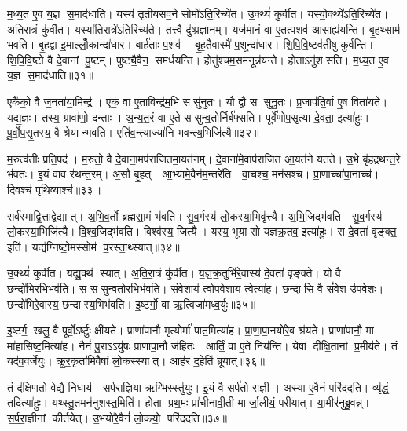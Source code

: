 म॒ध्य॒त ए॒व य॒ज्ञ स॒माद॑धाति। यस्य॑ तृतीयसव॒ने सोमो॑ऽति॒रिच्ये॑त। उ॒क्थ्यं॑ कुर्वीत। यस्यो॒क्थ्ये॑ऽति॒रिच्ये॑त। अ॒ति॒रा॒त्रं कु॑र्वीत। यस्या॑तिरा॒त्रे॑ऽति॒रिच्य॑ते। तत्त्वै दु॑ष्प्रज्ञा॒नम्। यज॑मानं॒ वा ए॒तत्प॒शव॑ आ॒साह्य॑यन्ति। बृ॒हथ्साम॑ भवति। बृ॒हद्वा इ॒माल्लोँ॒कान्दा॑धार। बार्\mbox{}ह॑ताः प॒शव॑। बृ॒ह॒तैवास्मै॑ प॒शून्दा॑धार। शि॒पि॒वि॒ष्टव॑तीषु कुर्वन्ति। शि॒पि॒वि॒ष्टो वै दे॒वानां पु॒ष्टम्। पुष्ट्यै॒वैन॒ सम॑र्धयन्ति। होतु॑श्चम॒समनून्न॑यन्ते। होताऽनु॑शसति। म॒ध्य॒त ए॒व य॒ज्ञ स॒माद॑धाति॥३१॥\anuvakamend[य॒न्ति॒ सव॑नस्याति॒रिच्य॑ते शसति दाधारा॒ष्टौ च॑]

एकै॑को॒ वै ज॒नता॑या॒मिन्द्र॑। एकं॒ वा ए॒ताविन्द्र॑म॒भि ससु॑नुतः। यौ द्वौ स सुनु॒तः। प्र॒जाप॑ति॒र्वा ए॒ष विता॑यते। यद्य॒ज्ञः। तस्य॒ ग्रावा॑णो॒ दन्ताः। अ॒न्य॒त॒रं वा ए॒ते ससुन्व॒तोर्निर्ब॑फ्सति। पूर्वे॑णोप॒सृत्या॑ दे॒वता॒ इत्या॑हुः। पू॒र्वो॒प॒सृ॒तस्य॒ वै श्रेयान्भवति। एति॑व॒न्त्याज्या॑नि भवन्त्य॒भिजि॑त्यै॥३२॥

म॒रुत्व॑तीः प्रति॒पद॑। म॒रुतो॒ वै दे॒वाना॒मप॑राजितमा॒यत॑नम्। दे॒वाना॑मे॒वाप॑राजित आ॒यत॑ने यतते। उ॒भे बृ॑हद्रथन्त॒रे भ॑वतः। इ॒यं वाव र॑थन्त॒रम्। अ॒सौ बृ॒हत्। आ॒भ्यामे॒वैन॑म॒न्तरे॑ति। वा॒चश्च॒ मन॑सश्च। प्रा॒णाच्चा॑पा॒नाच्च॑। दि॒वश्च॑ पृथि॒व्याश्च॑॥३३॥

सर्व॑स्माद्वि॒त्ताद्वेद्यात्। अ॒भि॒व॒र्तो ब्र॑ह्मसा॒मं भ॑वति। सु॒व॒र्गस्य॑ लो॒कस्या॒भिवृ॑त्त्यै। अ॒भि॒जिद्भ॑वति। सु॒व॒र्गस्य॑ लो॒कस्या॒भिजि॑त्यै। वि॒श्व॒जिद्भ॑वति। विश्व॑स्य॒ जित्यै। यस्य॒ भूयासो यज्ञक्र॒तव॒ इत्या॑हुः। स दे॒वता॑ वृङ्क्त॒ इति॑। यद्य॑ग्निष्टो॒मस्सोम॑ प॒रस्ता॒थ्स्यात्॥३४॥

उ॒क्थ्यं॑ कुर्वीत। यद्यु॒क्थ॑ स्यात्। अ॒ति॒रा॒त्रं कु॑र्वीत। य॒ज्ञ॒क्र॒तुभि॑रे॒वास्य॑ दे॒वता॑ वृङ्क्ते। यो वै छन्दो॑भिरभि॒भव॑ति। स ससुन्व॒तोर॒भिभ॑वति। सं॒वे॒शाय॑ त्वोपवे॒शाय॒ त्वेत्या॑ह। छन्दासि॒ वै सं॑वे॒श उ॑पवे॒शः। छन्दो॑भिरे॒वास्य॒ छन्दास्य॒भिभ॑वति। इ॒ष्टर्गो॒ वा ऋ॒त्विजा॑मध्व॒र्युः॥३५॥

इ॒ष्टर्ग॒ खलु॒ वै पूर्वो॒ऽर्ष्टुः क्षी॑यते। प्राणा॑पानौ मृ॒त्योर्मा॑ पात॒मित्या॑ह। प्रा॒णा॒पा॒नयो॑रे॒व श्र॑यते। प्राणा॑पानौ॒ मा मा॑हासिष्ट॒मित्या॑ह। नैनं॑ पु॒राऽऽयु॑षः प्राणापा॒नौ ज॑हितः। आर्तिं॒ वा ए॒ते निय॑न्ति। येषां दीक्षि॒तानां प्र॒मीय॑ते। तं यद॑व॒वर्जे॑युः। क्रू॒र॒कृता॑मिवैषां लो॒कस्स्यात्। आह॑र द॒हेति॑ ब्रूयात्॥३६॥

तं द॑क्षिण॒तो वेद्यै॑ नि॒धाय॑। स॒र्प॒रा॒ज्ञिया॑ ऋ॒ग्भिस्स्तु॑युः। इ॒यं वै सर्प॑तो॒ राज्ञी। अ॒स्या ए॒वैनं॒ परि॑ददति। व्यृ॑द्धं॒ तदित्या॑हुः। यथ्स्तु॒तमन॑नुशस्त॒मिति॑। होता प्रथ॒मः प्रा॑चीनावी॒ती मार्जा॒लीयं॒ परी॑यात्। या॒मीर॑नुब्रु॒वन्न्। स॒र्प॒रा॒ज्ञीनां कीर्तयेत्। उ॒भयो॑रे॒वैनं॑ लो॒कयो॒ परि॑ददति॥३७॥

